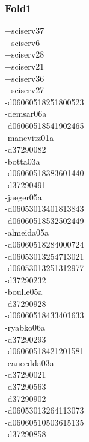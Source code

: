 \begin{multicols}{4}
\subsubsection*{Fold1}
+sciserv37\\
+sciserv6\\
+sciserv28\\
+sciserv21\\
+sciserv36\\
+sciserv27\\
-d06060518251800523\\
-demsar06a\\
-d06060518541902465\\
-manevitz01a\\
-d37290082\\
-botta03a\\
-d06060518383601440\\
-d37290491\\
-jaeger05a\\
-d06053013401813843\\
-d06060518532502449\\
-almeida05a\\
-d06060518284000724\\
-d06053013254713021\\
-d06053013251312977\\
-d37290232\\
-boulle05a\\
-d37290928\\
-d06060518433401633\\
-ryabko06a\\
-d37290293\\
-d06060518421201581\\
-cancedda03a\\
-d37290021\\
-d37290563\\
-d37290902\\
-d06053013264113073\\
-d06060510503615135\\
-d37290858\\

\end{multicols}
